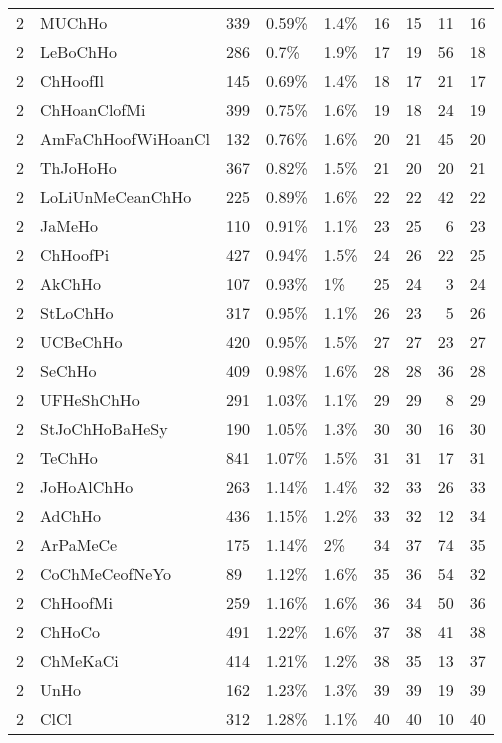 \begin{longtable}{lllllrrrr}
  2 & MUChHo & 339 & 0.59\% & 1.4\% &  16 &  15 &  11 &  16 \\ 
  2 & LeBoChHo & 286 & 0.7\% & 1.9\% &  17 &  19 &  56 &  18 \\ 
  2 & ChHoofIl & 145 & 0.69\% & 1.4\% &  18 &  17 &  21 &  17 \\ 
  2 & ChHoanClofMi & 399 & 0.75\% & 1.6\% &  19 &  18 &  24 &  19 \\ 
  2 & AmFaChHoofWiHoanCl & 132 & 0.76\% & 1.6\% &  20 &  21 &  45 &  20 \\ 
  2 & ThJoHoHo & 367 & 0.82\% & 1.5\% &  21 &  20 &  20 &  21 \\ 
  2 & LoLiUnMeCeanChHo & 225 & 0.89\% & 1.6\% &  22 &  22 &  42 &  22 \\ 
  2 & JaMeHo & 110 & 0.91\% & 1.1\% &  23 &  25 &   6 &  23 \\ 
  2 & ChHoofPi & 427 & 0.94\% & 1.5\% &  24 &  26 &  22 &  25 \\ 
  2 & AkChHo & 107 & 0.93\% & 1\% &  25 &  24 &   3 &  24 \\ 
  2 & StLoChHo & 317 & 0.95\% & 1.1\% &  26 &  23 &   5 &  26 \\ 
  2 & UCBeChHo & 420 & 0.95\% & 1.5\% &  27 &  27 &  23 &  27 \\ 
  2 & SeChHo & 409 & 0.98\% & 1.6\% &  28 &  28 &  36 &  28 \\ 
  2 & UFHeShChHo & 291 & 1.03\% & 1.1\% &  29 &  29 &   8 &  29 \\ 
  2 & StJoChHoBaHeSy & 190 & 1.05\% & 1.3\% &  30 &  30 &  16 &  30 \\ 
  2 & TeChHo & 841 & 1.07\% & 1.5\% &  31 &  31 &  17 &  31 \\ 
  2 & JoHoAlChHo & 263 & 1.14\% & 1.4\% &  32 &  33 &  26 &  33 \\ 
  2 & AdChHo & 436 & 1.15\% & 1.2\% &  33 &  32 &  12 &  34 \\ 
  2 & ArPaMeCe & 175 & 1.14\% & 2\% &  34 &  37 &  74 &  35 \\ 
  2 & CoChMeCeofNeYo & 89 & 1.12\% & 1.6\% &  35 &  36 &  54 &  32 \\ 
  2 & ChHoofMi & 259 & 1.16\% & 1.6\% &  36 &  34 &  50 &  36 \\ 
  2 & ChHoCo & 491 & 1.22\% & 1.6\% &  37 &  38 &  41 &  38 \\ 
  2 & ChMeKaCi & 414 & 1.21\% & 1.2\% &  38 &  35 &  13 &  37 \\ 
  2 & UnHo & 162 & 1.23\% & 1.3\% &  39 &  39 &  19 &  39 \\ 
  2 & ClCl & 312 & 1.28\% & 1.1\% &  40 &  40 &  10 &  40 \\ 

\end{longtable}

